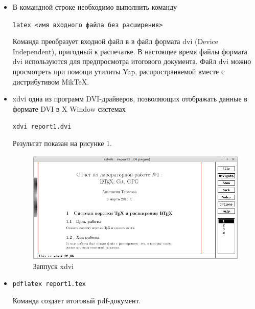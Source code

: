 \documentclass[12pt,a4paper]{article}
\begin{document}
\begin{itemize}
\item В командной строке необходимо выполнить команду

\verb+latex <имя входного файла без расширения>+

Команда преобразует входной файл в в файл формата dvi (Device Independent), пригодный к распечатке.
В настоящее время файлы формата dvi используются для предпросмотра итогового документа.
Файл dvi можно просмотреть при помощи утилиты Yap, распространяемой вместе с дистрибутивом MikTeX.
\item xdvi одна из программ DVI-драйверов, позволяющих отображать данные в формате
DVI в X Window системах

\verb+xdvi report1.dvi+

Результат показан на рисунке 1.
\begin{figure}[h!]
\centering
\includegraphics[scale=0.5]{res/xdvi}
\caption{Заппуск xdvi}
\end{figure}

\item
\verb+pdflatex report1.tex+

Команда создает итоговый pdf-документ.
\end{itemize}
\end{document}
